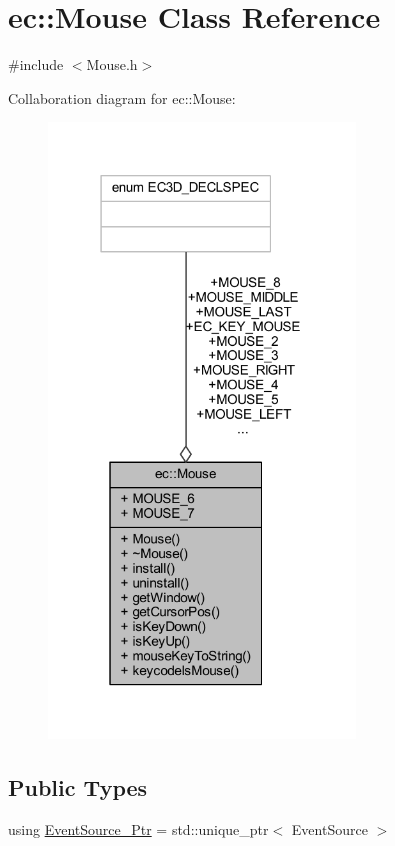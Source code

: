 \hypertarget{classec_1_1_mouse}{}\section{ec\+:\+:Mouse Class Reference}
\label{classec_1_1_mouse}


{\ttfamily \#include $<$Mouse.\+h$>$}



Collaboration diagram for ec\+:\+:Mouse\+:\nopagebreak
\begin{figure}[H]
\begin{center}
\leavevmode
\includegraphics[width=231pt]{classec_1_1_mouse__coll__graph}
\end{center}
\end{figure}
\subsection*{Public Types}
\begin{DoxyCompactItemize}
\item 
using \mbox{\hyperlink{classec_1_1_mouse_a6aa210c1821f23f8685a544a587ae11a}{Event\+Source\+\_\+\+Ptr}} = std\+::unique\+\_\+ptr$<$ Event\+Source $>$
\end{DoxyCompactItemize}
